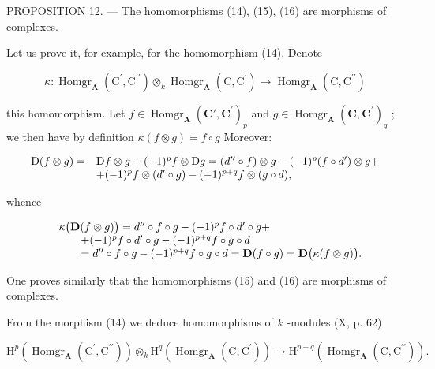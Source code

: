 PROPOSITION 12. --- The homomorphisms (14), (15), (16) are morphisms of complexes.

Let us prove it, for example, for the homomorphism (14). Denote

\[
\kappa : \operatorname{Homgr} _ {\mathbf {A}} \left(\mathrm{C} ^ {\prime}, \mathrm{C} ^ {\prime \prime}\right) \otimes_ {k} \operatorname{Homgr} _ {\mathbf {A}} \left(\mathrm{C}, \mathrm{C} ^ {\prime}\right)\rightarrow \operatorname{Homgr} _ {\mathbf {A}} \left(\mathrm{C}, \mathrm{C} ^ {\prime \prime}\right)
\]

this homomorphism. Let \(f \in \operatorname{Homgr}_{\mathbf{A}}(\mathbf{C}', \mathbf{C}^{\prime})_{p}\) and \(g \in \operatorname{Homgr}_{\mathbf{A}}(\mathbf{C}, \mathbf{C}^{\prime})_{q}\) ; we then have by definition \(\kappa(f \otimes g) = f \circ g\) Moreover:

\[
\begin{array}{r l} \mathrm{D} (f \otimes g) = & \mathrm{D} f \otimes g + (- 1) ^ {p} f \otimes \mathrm{D} g = (d ^ {\prime \prime} \circ f) \otimes g - (- 1) ^ {p} (f \circ d ^ {\prime}) \otimes g + \\ & + (- 1) ^ {p} f \otimes (d ^ {\prime} \circ g) - (- 1) ^ {p + q} f \otimes (g \circ d), \end{array}
\]

whence

\[
\begin{array}{r l} & {\kappa \big (\mathbf {D} (f \otimes g) \big) = d ^ {\prime \prime} \circ f \circ g - (- 1) ^ {p} f \circ d ^ {\prime} \circ g +} \\ & {\qquad + (- 1) ^ {p} f \circ d ^ {\prime} \circ g - (- 1) ^ {p + q} f \circ g \circ d} \\ & {\qquad = d ^ {\prime \prime} \circ f \circ g - (- 1) ^ {p + q} f \circ g \circ d = \mathbf {D} (f \circ g) = \mathbf {D} \big (\kappa (f \otimes g) \big).} \end{array}
\]

One proves similarly that the homomorphisms (15) and (16) are morphisms of complexes.

From the morphism (14) we deduce homomorphisms of \(k\) -modules (X, p. 62)

\[
\mathrm{H} ^ {p} \left(\operatorname{Homgr} _ {\mathbf {A}} \left(\mathrm{C} ^ {\prime}, \mathrm{C} ^ {\prime \prime}\right)\right) \otimes_ {k} \mathrm{H} ^ {q} \left(\operatorname{Homgr} _ {\mathbf {A}} \left(\mathrm{C}, \mathrm{C} ^ {\prime}\right)\right)\rightarrow \mathrm{H} ^ {p + q} \left(\operatorname{Homgr} _ {\mathbf {A}} \left(\mathrm{C}, \mathrm{C} ^ {\prime \prime}\right)\right). \tag {17}
\]

